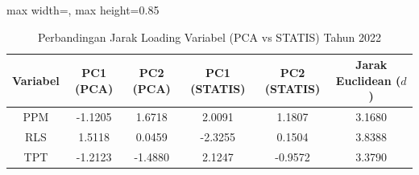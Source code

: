 \begin{table}[H]
\centering
\caption{Perbandingan Jarak Loading Variabel (PCA vs STATIS) Tahun 2022} \label{tab:sample1jarak_loading_2022}
\begin{adjustbox}{max width=\textwidth, max height=0.85\textheight}
\begin{tabular}{|c|c|c|c|c|c|}
\hline
\textbf{Variabel} & \textbf{PC1 (PCA)} & \textbf{PC2 (PCA)} & \textbf{PC1 (STATIS)} & \textbf{PC2 (STATIS)} & \textbf{Jarak Euclidean ($d$)} \\
\hline
PPM & -1.1205 & 1.6718 & 2.0091 & 1.1807 & 3.1680 \\
RLS & 1.5118 & 0.0459 & -2.3255 & 0.1504 & 3.8388 \\
TPT & -1.2123 & -1.4880 & 2.1247 & -0.9572 & 3.3790 \\
\hline
\end{tabular}
\end{adjustbox}
\end{table}